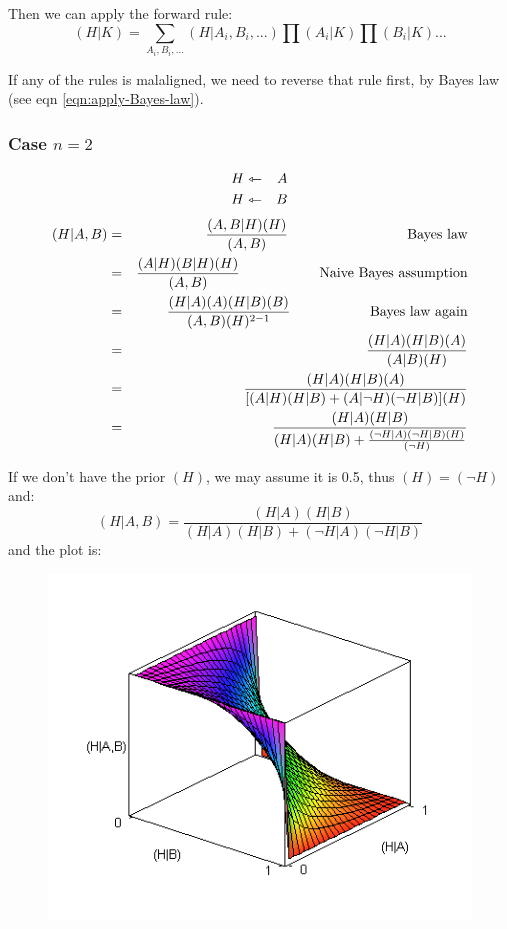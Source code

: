 Then we can apply the forward rule:
$$ (H|K) = \sum_{A_i,B_i,...} (H|A_i,B_i,...) \prod (A_i|K) \prod (B_i|K) ... $$

If any of the rules is malaligned, we need to reverse that rule first, by Bayes law
(see eqn \ref{eqn:apply-Bayes-law}).

\subsubsection{Case $n=2$}
\begin{eqnarray}
H &\leftarrowtriangle& A \nonumber \\
H &\leftarrowtriangle& B \nonumber
\end{eqnarray}
\begin{eqnarray}
(H|A,B) &=& \frac{ (A,B|H)(H) } { (A,B) } \tab\tab\tab \mbox{Bayes law} \nonumber \\
 &=& \frac{ (A|H) (B|H) (H) }{ (A,B) } \tab\tab \mbox{Naive Bayes assumption} \nonumber \\
 &=& \frac{ (H|A) (A) (H|B) (B) }{ (A,B) (H)^{2-1} } \tab\tab \mbox{Bayes law again} \nonumber \\
 &=& \frac{ (H|A) (H|B) (A) }{ (A|B) (H) } \nonumber \\
 &=& \frac{ (H|A) (H|B) (A) }{ [ (A|H)(H|B) + (A|\neg H)(\neg H|B) ] (H) } \nonumber \\
 &=& \frac{ (H|A) (H|B) }{ (H|A)(H|B) + \frac{(\neg H|A)(\neg H|B)(H)}{(\neg H)} } \nonumber
\end{eqnarray}

If we don't have the prior $(H)$, we may assume it is 0.5, thus $(H)=(\neg H)$ and:
$$ (H|A,B) = \frac{ (H|A) (H|B) }{ (H|A)(H|B) + (\neg H|A)(\neg H|B) } \nonumber $$
and the plot is:
\begin{figure}[H]
\centering
\includegraphics{Abrams-rule-plot.png}
\end{figure}

